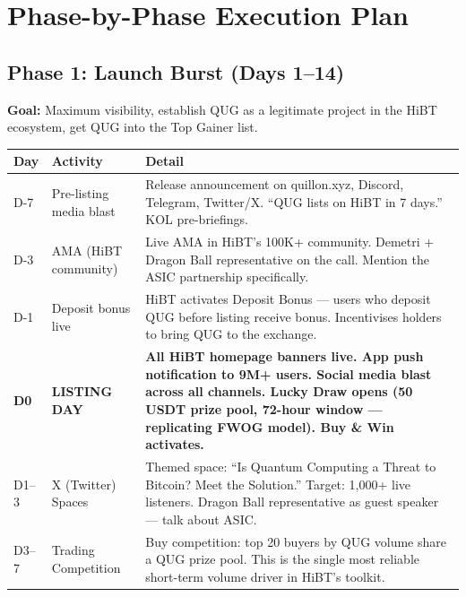 \documentclass[11pt,a4paper]{article}
\begin{document}
\section{Phase-by-Phase Execution Plan}

\subsection{Phase 1: Launch Burst (Days 1--14)}

\textbf{Goal:} Maximum visibility, establish QUG as a legitimate project in the HiBT ecosystem, get QUG into the Top Gainer list.

\begin{center}
\begin{longtable}{C{1.5cm} L{3.5cm} L{7cm}}
  \toprule
  \textbf{Day} & \textbf{Activity} & \textbf{Detail} \\
  \midrule
  \endhead
  \bottomrule
  \endfoot

  D-7 & Pre-listing media blast & Release announcement on quillon.xyz, Discord, Telegram, Twitter/X. ``QUG lists on HiBT in 7 days.'' KOL pre-briefings. \\

  D-3 & AMA (HiBT community) & Live AMA in HiBT's 100K+ community. Demetri + Dragon Ball representative on the call. Mention the ASIC partnership specifically. \\

  D-1 & Deposit bonus live & HiBT activates Deposit Bonus — users who deposit QUG before listing receive bonus. Incentivises holders to bring QUG to the exchange. \\

  \textbf{D0} & \textbf{LISTING DAY} & \textbf{All HiBT homepage banners live. App push notification to 9M+ users. Social media blast across all channels. Lucky Draw opens (50 USDT prize pool, 72-hour window — replicating FWOG model). Buy \& Win activates.} \\

  D1--3 & X (Twitter) Spaces & Themed space: ``Is Quantum Computing a Threat to Bitcoin? Meet the Solution.'' Target: 1,000+ live listeners. Dragon Ball representative as guest speaker — talk about ASIC. \\

  D3--7 & Trading Competition & Buy competition: top 20 buyers by QUG volume share a QUG prize pool. This is the single most reliable short-term volume driver in HiBT's toolkit. \\


\end{longtable}
\end{center}
\end{document}
